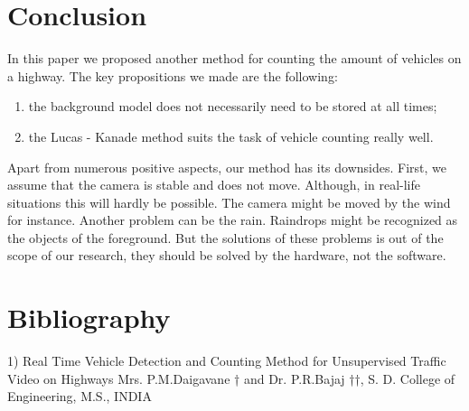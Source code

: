\documentclass[12pt,a4paper,oneside,titlepage]{article}
\begin{document}
\newpage
\section{Conclusion}


In this paper we proposed another method for counting the amount of vehicles on a highway.
The key propositions we made are the following:
\begin{enumerate}
	\item the background model does not necessarily need to be stored at all times;
	\item the Lucas - Kanade method suits the task of vehicle counting really well. 
\end{enumerate}

Apart from numerous positive aspects, our method has its downsides.
First, we assume that the camera is stable and does not move.
Although, in real-life situations this will hardly be possible.
The camera might be moved by the wind for instance.
Another problem can be the rain.
Raindrops might be recognized as the objects of the foreground.
But the solutions of these problems is out of the scope of our research, they should be solved by the hardware, not the software.



\newpage
\section{Bibliography}
1) Real Time Vehicle Detection and Counting Method for Unsupervised Traffic Video on Highways
Mrs. P.M.Daigavane † and Dr. P.R.Bajaj ††,
S. D. College of Engineering, M.S., INDIA
\end{document}
